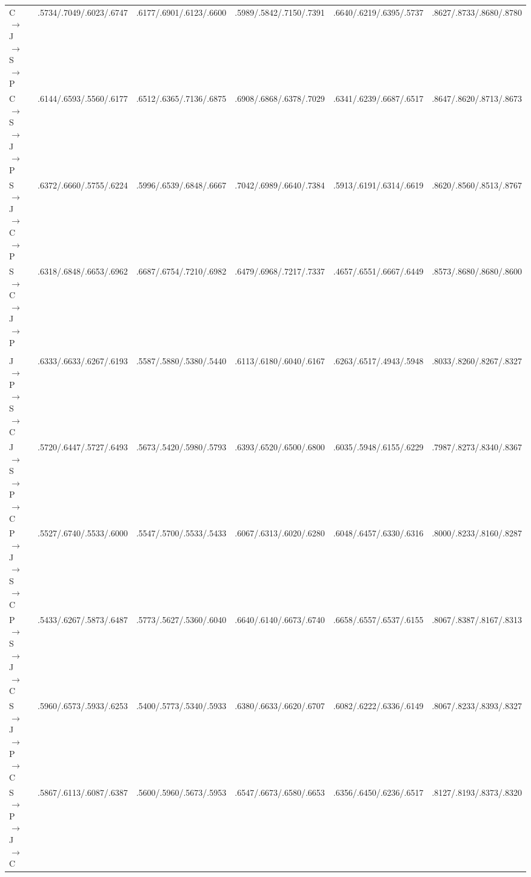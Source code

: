 \begin{table}[!htbp]
\begin{adjustbox}{width=0.95\textwidth}
\begin{tabular}{@{}lccccc@{}}
C $\rightarrow$ J $\rightarrow$ S $\rightarrow$ P
& .5734/.7049/.6023/.6747
& .6177/.6901/.6123/.6600
& .5989/.5842/.7150/.7391
& .6640/.6219/.6395/.5737
& .8627/.8733/.8680/.8780 \\

C $\rightarrow$ S $\rightarrow$ J $\rightarrow$ P
& .6144/.6593/.5560/.6177
& .6512/.6365/.7136/.6875
& .6908/.6868/.6378/.7029
& .6341/.6239/.6687/.6517
& .8647/.8620/.8713/.8673 \\

S $\rightarrow$ J $\rightarrow$ C $\rightarrow$ P
& .6372/.6660/.5755/.6224
& .5996/.6539/.6848/.6667
& .7042/.6989/.6640/.7384
& .5913/.6191/.6314/.6619
& .8620/.8560/.8513/.8767 \\

S $\rightarrow$ C $\rightarrow$ J $\rightarrow$ P
& .6318/.6848/.6653/.6962
& .6687/.6754/.7210/.6982
& .6479/.6968/.7217/.7337
& .4657/.6551/.6667/.6449
& .8573/.8680/.8680/.8600 \\


\addlinespace[1pt]
\rowcolor{black!7}
\multicolumn{6}{@{}l}{\textit{Target C++ (C)}} \\

J $\rightarrow$ P $\rightarrow$ S $\rightarrow$ C
& .6333/.6633/.6267/.6193
& .5587/.5880/.5380/.5440
& .6113/.6180/.6040/.6167
& .6263/.6517/.4943/.5948
& .8033/.8260/.8267/.8327 \\

J $\rightarrow$ S $\rightarrow$ P $\rightarrow$ C
& .5720/.6447/.5727/.6493
& .5673/.5420/.5980/.5793
& .6393/.6520/.6500/.6800
& .6035/.5948/.6155/.6229
& .7987/.8273/.8340/.8367 \\

P $\rightarrow$ J $\rightarrow$ S $\rightarrow$ C
& .5527/.6740/.5533/.6000
& .5547/.5700/.5533/.5433
& .6067/.6313/.6020/.6280
& .6048/.6457/.6330/.6316
& .8000/.8233/.8160/.8287 \\

P $\rightarrow$ S $\rightarrow$ J $\rightarrow$ C
& .5433/.6267/.5873/.6487
& .5773/.5627/.5360/.6040
& .6640/.6140/.6673/.6740
& .6658/.6557/.6537/.6155
& .8067/.8387/.8167/.8313 \\

S $\rightarrow$ J $\rightarrow$ P $\rightarrow$ C
& .5960/.6573/.5933/.6253
& .5400/.5773/.5340/.5933
& .6380/.6633/.6620/.6707
& .6082/.6222/.6336/.6149
& .8067/.8233/.8393/.8327 \\

S $\rightarrow$ P $\rightarrow$ J $\rightarrow$ C
& .5867/.6113/.6087/.6387
& .5600/.5960/.5673/.5953
& .6547/.6673/.6580/.6653
& .6356/.6450/.6236/.6517
& .8127/.8193/.8373/.8320 \\


\bottomrule
\end{tabular}
\end{adjustbox}
\end{table}
